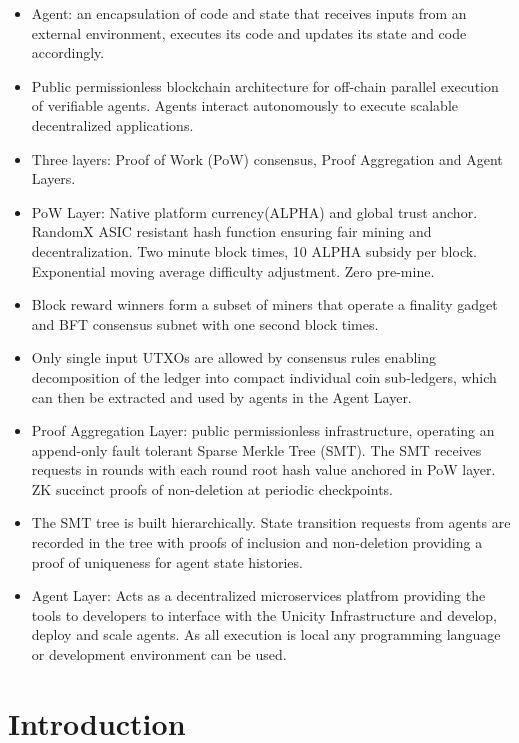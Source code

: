 \documentclass{article}
\begin{document}
\begin{itemize}

  \setlength{\leftmargin}{1em}
  
 \item Agent: an encapsulation of code and state that receives inputs from an external environment, executes its code and updates its state and code accordingly.
 \item Public permissionless blockchain architecture for off-chain parallel execution of verifiable agents. Agents interact autonomously to execute scalable decentralized applications.
 \item  Three layers: Proof of Work (PoW) consensus, Proof Aggregation and Agent Layers.
\item PoW Layer: Native platform currency(ALPHA) and global trust anchor. RandomX ASIC resistant hash function ensuring fair mining and decentralization. Two minute block times, 10 ALPHA subsidy per block. Exponential moving average difficulty adjustment. Zero pre-mine.
\item  Block reward winners form a subset of miners that operate a finality gadget and BFT consensus subnet with one second block times. 
\item Only single input UTXOs are allowed by consensus rules enabling decomposition of the ledger into compact individual coin sub-ledgers, which can then be extracted and used by agents in the Agent Layer.
\item Proof Aggregation Layer: public permissionless infrastructure, operating an append-only fault tolerant Sparse Merkle Tree (SMT). The SMT receives requests in rounds with each round root hash value anchored in PoW layer. ZK succinct proofs of non-deletion at periodic checkpoints.
\item The SMT tree is built hierarchically. State transition requests from agents are recorded in the tree with proofs of inclusion and non-deletion providing a proof of uniqueness for agent state histories.
\item Agent Layer: Acts as a decentralized microservices platfrom providing the tools to developers to interface with the Unicity Infrastructure and develop, deploy and scale agents. As all execution is local any programming language or development environment can be used.
\end{itemize}


\section{Introduction}
\end{document}
